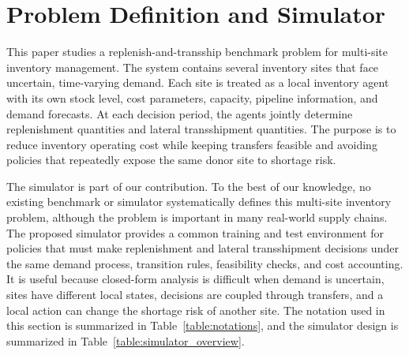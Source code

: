 \documentclass[journal]{IEEEtran}
\begin{document}
%
%
%



\section{Problem Definition and Simulator}
\label{sec3:problem}

This paper studies a replenish-and-transship benchmark problem for multi-site inventory management. The system contains several inventory sites that face uncertain, time-varying demand. Each site is treated as a local inventory agent with its own stock level, cost parameters, capacity, pipeline information, and demand forecasts. At each decision period, the agents jointly determine replenishment quantities and lateral transshipment quantities. The purpose is to reduce inventory operating cost while keeping transfers feasible and avoiding policies that repeatedly expose the same donor site to shortage risk.

The simulator is part of our contribution. To the best of our knowledge, no existing benchmark or simulator systematically defines this multi-site inventory problem, although the problem is important in many real-world supply chains. The proposed simulator provides a common training and test environment for policies that must make replenishment and lateral transshipment decisions under the same demand process, transition rules, feasibility checks, and cost accounting. It is useful because closed-form analysis is difficult when demand is uncertain, sites have different local states, decisions are coupled through transfers, and a local action can change the shortage risk of another site. The notation used in this section is summarized in Table~\ref{table:notations}, and the simulator design is summarized in Table~\ref{table:simulator_overview}.
\end{document}
